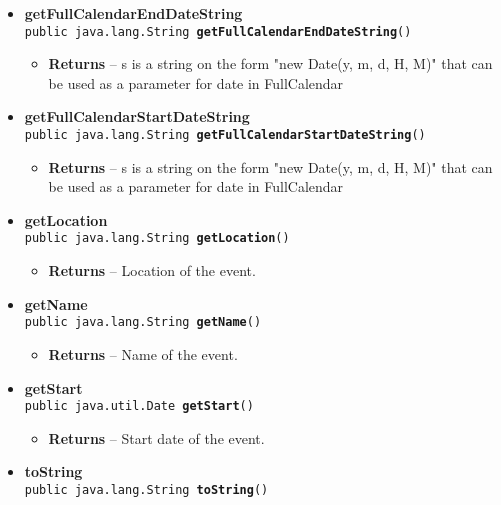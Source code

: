 \documentclass[11pt,a4paper]{report}
\begin{document}
{{{\begin{itemize}
{\begin{itemize}
\item{{\bf  Returns} -- 
End date of the event. 
}%
\end{itemize}
}%
\item{ 
{\bf  getFullCalendarEndDateString}\\
\texttt{public java.lang.String\ {\bf  getFullCalendarEndDateString}()
\label{is.mpg.ruglan.CalEvent.getFullCalendarEndDateString()}}%
\begin{itemize}
\item{{\bf  Returns} -- 
s is a string on the form "new Date(y, m, d, H, M)" that can be used as a parameter for date in FullCalendar 
}%
\end{itemize}
}%
\item{ 
{\bf  getFullCalendarStartDateString}\\
\texttt{public java.lang.String\ {\bf  getFullCalendarStartDateString}()
\label{is.mpg.ruglan.CalEvent.getFullCalendarStartDateString()}}%
\begin{itemize}
\item{{\bf  Returns} -- 
s is a string on the form "new Date(y, m, d, H, M)" that can be used as a parameter for date in FullCalendar 
}%
\end{itemize}
}%
\item{ 
{\bf  getLocation}\\
\texttt{public java.lang.String\ {\bf  getLocation}()
\label{is.mpg.ruglan.CalEvent.getLocation()}}%
\begin{itemize}
\item{{\bf  Returns} -- 
Location of the event. 
}%
\end{itemize}
}%
\item{ 
{\bf  getName}\\
\texttt{public java.lang.String\ {\bf  getName}()
\label{is.mpg.ruglan.CalEvent.getName()}}%
\begin{itemize}
\item{{\bf  Returns} -- 
Name of the event. 
}%
\end{itemize}
}%
\item{ 
{\bf  getStart}\\
\texttt{public java.util.Date\ {\bf  getStart}()
\label{is.mpg.ruglan.CalEvent.getStart()}}%
\begin{itemize}
\item{{\bf  Returns} -- 
Start date of the event. 
}%
\end{itemize}
}%
\item{ 
{\bf  toString}\\
\texttt{public java.lang.String\ {\bf  toString}()
\label{is.mpg.ruglan.CalEvent.toString()}}%
}%
\end{itemize}
}
}
}
\end{document}
